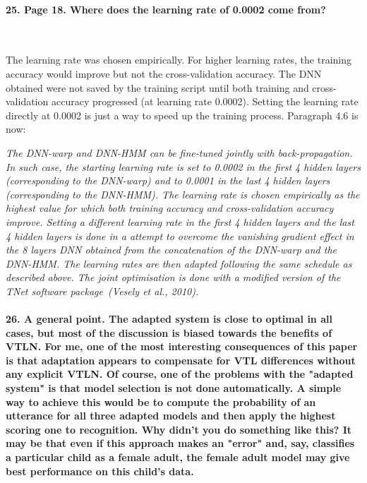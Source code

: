 \documentclass[]{article}
\begin{document}
\paragraph{25. Page 18. Where does the learning rate of 0.0002 come from?}

~

The learning rate was chosen empirically. For higher learning rates, the training accuracy would improve but not the cross-validation accuracy. The DNN obtained were not saved by the training script until both training and cross-validation accuracy progressed (at learning rate 0.0002). Setting the learning rate directly at 0.0002 is just a way to speed up the training process. Paragraph 4.6 is now:

\textit{The DNN-warp and DNN-HMM can be fine-tuned jointly with back-propagation. In such case, the starting learning rate is set to 0.0002 in the first 4 hidden layers (corresponding to the DNN-warp) and to 0.0001 in the last 4 hidden layers (corresponding to the DNN-HMM). The learning rate is chosen empirically as the highest value for which both training accuracy and cross-validation accuracy improve. Setting a different learning rate in the first 4 hidden layers and the last 4 hidden layers is done in a attempt to overcome the vanishing gradient effect in the 8 layers DNN obtained from the concatenation of the DNN-warp and the DNN-HMM. The learning rates are then adapted following the same schedule as described above. The joint optimisation is done with a modified version of the TNet software package~(Vesely et al., 2010).}

\paragraph{26. A general point. The adapted system is close to optimal in all cases, but most of the discussion is biased towards the benefits of VTLN. For me, one of the most interesting consequences of this paper is that adaptation appears to compensate for VTL differences without any explicit VTLN. Of course, one of the problems with the "adapted system" is that model selection is not done automatically. A simple way to achieve this would be to compute the probability of an utterance for all three adapted models and then apply the highest scoring one to recognition. Why didn't you do something like this? It may be that even if this approach makes an "error" and, say, classifies a particular child as a female adult, the female adult model may give best performance on this child's data.}
\end{document}

